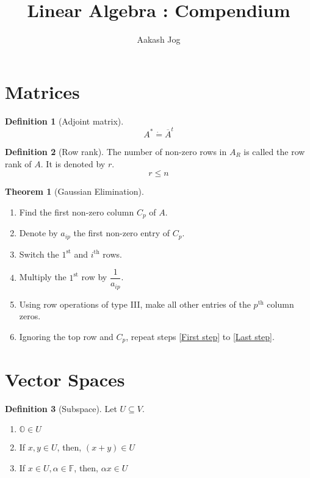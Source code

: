 \documentclass[fleqn, a5paper, 10pt]{amsart}
\title{Linear Algebra : Compendium}
\author{Aakash Jog}
\date{\formatdate{26}{1}{2015}}
\theoremstyle{definition}
\newtheorem{definition}{Definition} %
\theoremstyle{theorem}
\newtheorem{theorem}{Theorem} %
\theoremstyle{remark}
\numberwithin{corollary}{theorem}
\numberwithin{equation}{theorem}
\begin{document}
\maketitle



\section{Matrices}

\begin{definition}[Adjoint matrix]
	\begin{equation*}
		A^* \dot{=} \overline{A}^t
	\end{equation*}
\end{definition}

\begin{definition}[Row rank]
	The number of non-zero rows in $A_R$ is called the row rank of $A$. It is denoted by $r$.
	\begin{equation*}
		r \leq n
	\end{equation*}
\end{definition}

\begin{theorem}[Gaussian Elimination]
	~\\
	\begin{enumerate}[label=Step \arabic*]
		\item Find the first non-zero column $C_p$ of $A$. \label{First step}
		\item Denote by $a_{ip}$ the first non-zero entry of $C_p$.
		\item Switch the $1^{\text{st}}$ and $i^{\text{th}}$ rows.
		\item Multiply the $1^{\text{st}}$ row by $\dfrac{1}{a_{ip}}$.
		\item Using row operations of type III, make all other entries of the $p^{\text{th}}$ column zeros. \label{Last step}
		\item Ignoring the top row and $C_p$, repeat steps \ref{First step} to \ref{Last step}.
	\end{enumerate}
\end{theorem}

\section{Vector Spaces}

\begin{definition}[Subspace]
	Let $U \subseteq V$. 
	\begin{enumerate}[label=Axiom \arabic*]
		\item $\mathbb{O} \in U$ \label{Axiom 1}
		\item If $x, y \in U$, then, $(x + y) \in U$ \label{Axiom 2}
		\item If $x \in U, \alpha \in \mathbb{F}$, then, $\alpha x \in U$ \label{Axiom 3}
	\end{enumerate}
\end{definition}
\end{document}
